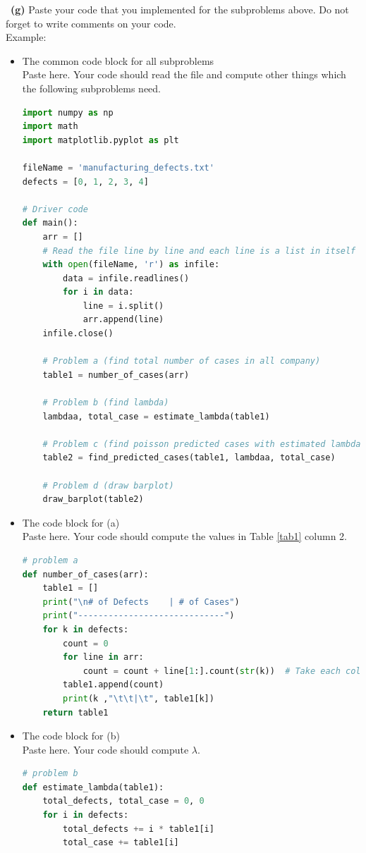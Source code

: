 \documentclass[a4 paper]{article}
\numberwithin{equation}{section}
\newcommand{\subproblem}[1]{~\newline\textbf{(#1)}}
\newcommand{\0}{\mathbf{0}}
\begin{document}
	\subproblem{g} Paste your code that you implemented for the subproblems above. Do not forget to write comments on your code.\\
	Example:\\
	\begin{itemize}
		\item The common code block for all subproblems\\
		Paste here. Your code should read the file and compute other things which the following subproblems need.
		\begin{lstlisting}[language=Python]
import numpy as np
import math
import matplotlib.pyplot as plt

fileName = 'manufacturing_defects.txt'
defects = [0, 1, 2, 3, 4]

# Driver code
def main():
    arr = []
    # Read the file line by line and each line is a list in itself
    with open(fileName, 'r') as infile:
        data = infile.readlines()
        for i in data:
            line = i.split()
            arr.append(line)
    infile.close()

    # Problem a (find total number of cases in all company)
    table1 = number_of_cases(arr)

    # Problem b (find lambda)
    lambdaa, total_case = estimate_lambda(table1)

    # Problem c (find poisson predicted cases with estimated lambda)
    table2 = find_predicted_cases(table1, lambdaa, total_case)

    # Problem d (draw barplot)
    draw_barplot(table2)
        \end{lstlisting}

		\item The code block for (a)\\
		Paste here. Your code should compute the values in Table \ref{tab1} column 2.
		\begin{lstlisting}[language=Python]
# problem a
def number_of_cases(arr):
    table1 = []
    print("\n# of Defects    | # of Cases")
    print("-----------------------------")
    for k in defects:
        count = 0
        for line in arr:
            count = count + line[1:].count(str(k))  # Take each column except first column
        table1.append(count)
        print(k ,"\t\t|\t", table1[k])
    return table1
        \end{lstlisting}

		\item The code block for (b)\\
		Paste here. Your code should compute $\lambda$.
		\begin{lstlisting}[language=Python]
# problem b
def estimate_lambda(table1):
    total_defects, total_case = 0, 0
    for i in defects:
        total_defects += i * table1[i]
        total_case += table1[i]


\end{lstlisting}
\end{itemize}
\end{document}
